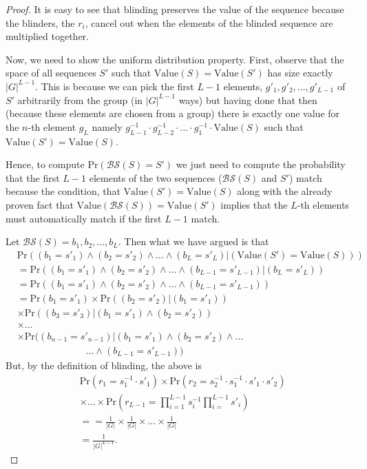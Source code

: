 \begin{proof}
It is  easy to see that  blinding preserves the value  of the sequence
because the blinders,  the $r_i$, cancel out when  the elements of the
blinded sequence are multiplied together.

Now, we need to show the uniform distribution property. First, observe
that  the space  of all  sequences $S'$  such that  $\mbox{Value}(S) =
\mbox{Value}(S')$ has  size exactly  $|G|^{L-1}$.  This is  because we
can pick  the first $L-1$  elements, $g'_1, g'_2,\ldots,  g'_{L-1}$ of
$S'$ arbitrarily from the group  (in $|G|^{L-1}$ ways) but having done
that then  (because these elements are  chosen from a  group) there is
exactly   one   value   for    the   $n$-th   element   $g_L$   namely
$g_{L-1}^{-1}\cdot            g_{L-2}^{-1}            \cdot\ldots\cdot
g_1^{-1}\cdot\mbox{Value}(S)$    such    that   $\mbox{Value}(S')    =
\mbox{Value}(S)$.

Hence, to  compute $\mbox{Pr}(\mathcal{BS}(S) =  S')$ we just  need to
compute  the probability  that the  first  $L-1$ elements  of the  two
sequences  ($\mathcal{BS}(S)$ and $S'$)  match because  the condition,
that  $\mbox{Value}(S')  =  \mbox{Value}(S)$  along with  the  already
proven  fact that  $\mbox{Value}(\mathcal{BS}(S))  = \mbox{Value}(S')$
implies that the $L$-th elements must automatically match if the first
$L-1$ match.

Let $\mathcal{BS}(S) = b_1, b_2,\ldots, b_L$. Then what we have argued
is that
\begin{align*}
  & \mbox{Pr}((b_1 = s'_1) \wedge (b_2 = s'_2) \wedge \dots \wedge (b_L = s'_L)|(\mbox{Value}(S') = \mbox{Value}(S)))\\
  & =\mbox{Pr}((b_1 = s'_1) \wedge (b_2 = s'_2) \wedge \dots \wedge (b_{L-1} = s'_{L-1})| (b_L = s'_L))\\
  & =\mbox{Pr}((b_1 = s'_1) \wedge (b_2 = s'_2) \wedge \dots \wedge (b_{L-1} = s'_{L-1})) \\
  & =\mbox{Pr}(b_1 = s'_1)  \times \mbox{Pr}((b_2 = s'_2)|(b_1 = s'_1))\\ 
  & \times\mbox{Pr}((b_3 = s'_3)|(b_1 = s'_1) \wedge (b_2 = s'_2)) \\ 
  & \times \dots \\
  & \times \mbox{Pr}((b_{n-1} = s'_{n-1})|  (b_1 = s'_1) \wedge (b_2 =
  s'_2) \wedge \ldots \\
  & \hspace{3cm} \ldots \wedge (b_{L-1} = s'_{L-1}))
\end{align*}
But, by the definition of blinding, the above is 
\begin{align*}
  & \mbox{Pr}(r_1 = s_1^{-1}\cdot s'_1) \times \mbox{Pr}(r_2 = s_2^{-1}\cdot s_1^{-1}\cdot s'_1 \cdot s'_2) \\
  & \times \dots \times \mbox{Pr}(r_{L-1} = \prod_{i=1}^{L-1}s_i^{-1}\prod_{i=}^{L-1}s'_i) \\
  & ==\frac{1}{|G|} \times \frac{1}{|G|} \times\dots\times \frac{1}{|G|}\\
  & =\frac{1}{|G|^{L-1}}.
\end{align*}


\end{proof}
